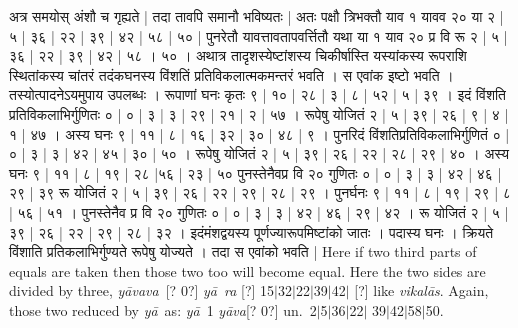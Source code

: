 \documentclass[11pt,a5paper]{book}
\def\ya{\textit{y\=a}}
\def\yava{\textit{y\=ava}}
\def\yavava{\textit{y\=avava}}
\def\vikalas{\textit{vi\-ka\-l\=as}}
\def\danda{$|$}
\begin{document}
\newpage
{\s अत्र समयोस् अंशौ च गृह्यते | तदा तावपि
समानौ भविष्यतः | अतः पक्षौ त्रिभक्तौ याव १ यावव २० 
या २ | ५ | ३६ | २२ | ३९ | ४२ | ५८ | ५० | 
पुनरेतौ यावत्तावतापवर्त्तितौ यथा या १
याव २० प्र वि रू २ | ५ | ३६ | २२ | ३९ | ४२ | ५८ । ५० । 
अथात्र तादृशस्येष्टांशस्य चिकीर्षास्ति यस्यांकस्य रूपराशि
स्थितांकस्य चांतरं तदंकघनस्य विंशतिं 
प्रतिविकलात्मकमन्तरं भवति । स एवांक इष्टो भवति । तस्योत्पादनेऽयमुपाय उपलब्धः । रूपाणां घनः कृतः ९ | १० | २८ | ३ | ८ | ५२ | ५ | ३९ ।
इदं विंशति प्रतिविकलाभिर्गुणितः ० | ० | ३ | ३ | २९ | २१ | २ | ५७ । 
रूपेषु योजितं २ | ५ | ३९ | २६ | ९ | ४ | १ | ४७ । अस्य घनः ९ | ११ | ८ | १६ | ३२ | ३० | ४८ | ९ । 
पुनरिदं विंशतिप्रतिविकलाभिर्गुणितं ० | ० | ३ | ३ | ४२ | ४५ | ३० | ५० । 
रूपेषु योजितं २ | ५ | ३९ | २६ | २२ | २८ | २९ | ४० । अस्य घनः 
९ | ११ | ८ | १९ | २८ |५६ | २३ | ५० पुनस्तेनैवप्र वि
२० गुणितः ० | ० | ३ | ३ | ४२ | ४६ | २९ | ३९
रू योजितं २ | ५ | ३९ | २६ | २२ | २९ | २८ | २९ । पुनर्घनः ९ | ११ | ८ | १९ | २९ | ८ | ५६ | ५१ । 
पुनस्तेनैव प्र वि २० गुणितः ० | ० | ३ | ३ | ४२ | ४६ | २९ | ४२ ।
रू योजितं २ | ५ | ३९ | २६ | २२ | २९ | २८ | ३२ ।
इदंमंशद्वयस्य पूर्णज्यारूपमिष्टांको जातः । पदास्य घनः । क्रियते विंशाति प्रतिकलाभिर्गुण्यते
रूपेषु योज्यते । तदा स एवांको भवति | }
\newpage
Here if two third parts of equals are taken then those two too will become equal.   Here the two sides
are divided by three, \yavava\ [? 0?] \ya\ \textit{ra} [?] 15\danda 32\danda 22\danda 39\danda 42\danda
[?] like \vikalas.
Again, those two reduced by \ya\ as: \ya\ 1 \yava [? 0?] un.\ 2\danda 5\danda 36\danda 22\danda 
39\danda 42\danda 58\danda 50. 
\end{document}
